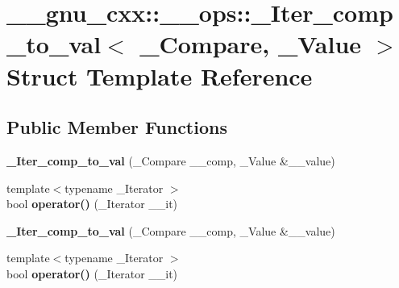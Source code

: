 \hypertarget{struct____gnu__cxx_1_1____ops_1_1__Iter__comp__to__val}{\section{\+\_\+\+\_\+gnu\+\_\+cxx\+:\+:\+\_\+\+\_\+ops\+:\+:\+\_\+\+Iter\+\_\+comp\+\_\+to\+\_\+val$<$ \+\_\+\+Compare, \+\_\+\+Value $>$ Struct Template Reference}
\label{struct____gnu__cxx_1_1____ops_1_1__Iter__comp__to__val}
}
\subsection*{Public Member Functions}
\begin{DoxyCompactItemize}
\item 
\hypertarget{struct____gnu__cxx_1_1____ops_1_1__Iter__comp__to__val_a7bfe6b388b4b392ba110b7e451c074ea}{{\bfseries \+\_\+\+Iter\+\_\+comp\+\_\+to\+\_\+val} (\+\_\+\+Compare \+\_\+\+\_\+comp, \+\_\+\+Value \&\+\_\+\+\_\+value)}\label{struct____gnu__cxx_1_1____ops_1_1__Iter__comp__to__val_a7bfe6b388b4b392ba110b7e451c074ea}

\item 
\hypertarget{struct____gnu__cxx_1_1____ops_1_1__Iter__comp__to__val_afb8645c7f342160917b2e7671909bb34}{{\footnotesize template$<$typename \+\_\+\+Iterator $>$ }\\bool {\bfseries operator()} (\+\_\+\+Iterator \+\_\+\+\_\+it)}\label{struct____gnu__cxx_1_1____ops_1_1__Iter__comp__to__val_afb8645c7f342160917b2e7671909bb34}

\item 
\hypertarget{struct____gnu__cxx_1_1____ops_1_1__Iter__comp__to__val_a7bfe6b388b4b392ba110b7e451c074ea}{{\bfseries \+\_\+\+Iter\+\_\+comp\+\_\+to\+\_\+val} (\+\_\+\+Compare \+\_\+\+\_\+comp, \+\_\+\+Value \&\+\_\+\+\_\+value)}\label{struct____gnu__cxx_1_1____ops_1_1__Iter__comp__to__val_a7bfe6b388b4b392ba110b7e451c074ea}

\item 
\hypertarget{struct____gnu__cxx_1_1____ops_1_1__Iter__comp__to__val_afb8645c7f342160917b2e7671909bb34}{{\footnotesize template$<$typename \+\_\+\+Iterator $>$ }\\bool {\bfseries operator()} (\+\_\+\+Iterator \+\_\+\+\_\+it)}\label{struct____gnu__cxx_1_1____ops_1_1__Iter__comp__to__val_afb8645c7f342160917b2e7671909bb34}

\end{DoxyCompactItemize}
